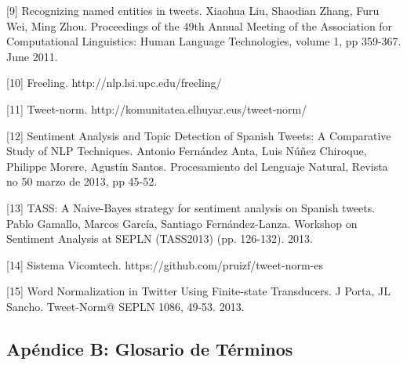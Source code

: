 \documentclass[14pt]{extarticle}
\theoremstyle{definition}
\theoremstyle{remark}
\begin{document}
[9] Recognizing named entities in tweets. Xiaohua Liu, Shaodian Zhang, Furu Wei, Ming Zhou. Proceedings of the 49th Annual Meeting of the Association for Computational Linguistics: Human Language Technologies, volume 1, pp 359-367. June 2011.

[10] Freeling. http://nlp.lsi.upc.edu/freeling/

[11] Tweet-norm. http://komunitatea.elhuyar.eus/tweet-norm/

[12] Sentiment Analysis and Topic Detection of Spanish Tweets: A Comparative Study of NLP Techniques. Antonio Fernández Anta, Luis Núñez Chiroque, Philippe Morere, Agustín Santos. Procesamiento del Lenguaje Natural, Revista no 50 marzo de 2013, pp 45-52.

[13] TASS: A Naive-Bayes strategy for sentiment analysis on Spanish tweets. Pablo Gamallo, Marcos García, Santiago Fernández-Lanza. Workshop on Sentiment Analysis at SEPLN (TASS2013) (pp. 126-132). 2013.

[14] Sistema Vicomtech. https://github.com/pruizf/tweet-norm-es

[15] Word Normalization in Twitter Using Finite-state Transducers. J Porta, JL Sancho. Tweet-Norm@ SEPLN 1086, 49-53. 2013.

\newpage
\subsection{Apéndice B: Glosario de Términos}\label{sec:glosariodeterminos}
\end{document}
